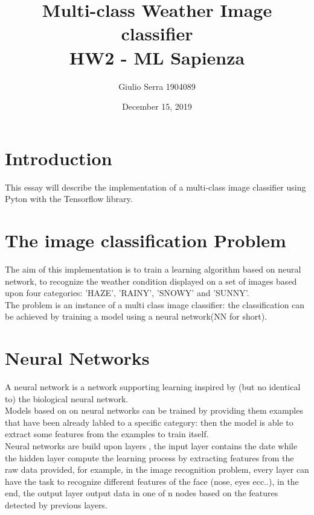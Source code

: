 \documentclass{article}
\begin{document}
\pagecolor{white}

\title{%
  Multi-class Weather Image classifier
  \large \\HW2 - ML Sapienza}

\author{Giulio Serra 1904089}
\date{December 15, 2019}

\maketitle


\begin{titlepage}
\end{titlepage}

\tableofcontents

\begin{titlepage}
\end{titlepage}


\section{Introduction}\label{sec:intro}
This essay will describe the implementation of a multi-class image classifier using Pyton with the Tensorflow library.

\section{The image classification Problem}
The aim of this implementation is to train a learning algorithm based on neural network, to recognize the weather condition displayed on a set of images based upon four categories: 'HAZE', 'RAINY', 'SNOWY' and 'SUNNY'.\\
The problem is an instance of a multi class image classifier: the classification can be achieved by training a model using a neural network(NN for short).\\

\section{Neural Networks}
A neural network is a network supporting learning inspired by (but no identical to) the biological neural network.\\Models based on on neural networks can be trained by providing them examples that have been already labled to a specific category: then the model is able to extract some features from the examples to train itself.\\
Neural networks are build upon layers , the input layer contains the date while the hidden layer compute the learning process by extracting features from the raw data provided, for example, in the image recognition problem, every layer can have the task to recognize different features of the face (nose, eyes ecc..), in the end, the output layer output data in one of n nodes based on the features detected by previous layers. 
\end{document}
